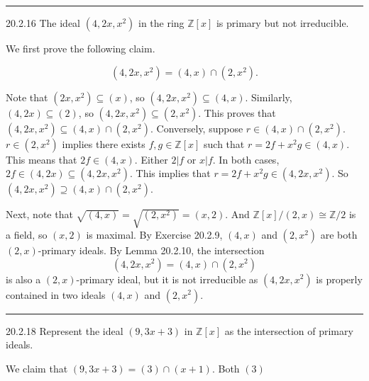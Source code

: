 \documentclass[letterpaper, 12pt]{article}
\begin{document}
\noindent\rule{7in}{2.8pt}
\begin{problem}{20.2.16}
The ideal \((4,2x,x^2)\) in the ring \(\mathbb{Z}[x]\) is primary but not irreducible.
\end{problem}
\begin{solution}
We first prove the following claim.
\begin{claim}
\[(4,2x,x^2)=(4,x)\cap (2,x^2).\]
\end{claim}
\begin{claimproof}
Note that \((2x,x^2)\subseteq (x)\), so \((4,2x,x^2)\subseteq (4,x)\). Similarly, \((4,2x)\subseteq (2)\), so \((4,2x,x^2)\subseteq (2,x^2)\). This proves that \((4,2x,x^2)\subseteq (4,x)\cap (2,x^2)\). Conversely, suppose \(r\in (4,x)\cap (2,x^2)\). \(r\in (2,x^2)\) implies there exists \(f,g\in \mathbb{Z}[x]\) such that \(r=2f+x^2g\in (4,x)\). This means that \(2f\in (4,x)\). Either \(2|f\) or \(x|f\). In both cases, \(2f\in (4,2x)\subseteq (4,2x,x^2)\). This implies that \(r=2f+x^2g\in (4,2x,x^2)\). So \((4,2x,x^2)\supseteq (4,x)\cap (2,x^2)\).
\end{claimproof}

Next, note that \(\sqrt{(4,x)}=\sqrt{(2,x^2)}=(x,2)\). And \(\mathbb{Z}[x]/(2,x)\cong \mathbb{Z}/2\) is a field, so \((x,2)\) is maximal. By Exercise 20.2.9, \((4,x)\) and \((2,x^2)\) are both \((2,x)\)-primary ideals. By Lemma 20.2.10, the intersection 
\[(4,2x,x^2)=(4,x)\cap (2,x^2)\]
is also a \((2,x)\)-primary ideal, but it is not irreducible as \((4,2x,x^2)\) is properly contained in two ideals \((4,x)\) and \((2,x^2)\). 
\end{solution}

\noindent\rule{7in}{2.8pt}
\begin{problem}{20.2.18}
Represent the ideal \((9,3x+3)\) in \(\mathbb{Z}[x]\) as the intersection of primary ideals.
\end{problem}
\begin{solution}
We claim that \((9,3x+3)=(3)\cap (x+1)\). Both \((3)\) 
\end{solution}
\end{document}
